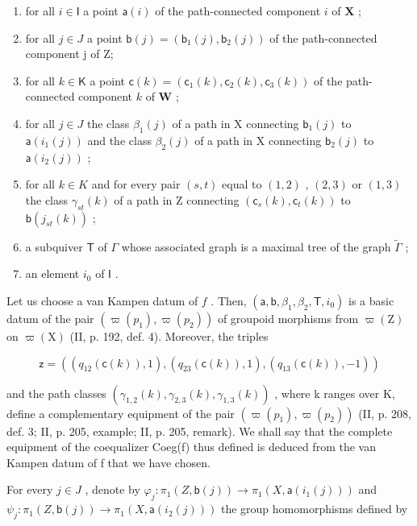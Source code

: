 \begin{enumerate}
\def\labelenumi{(\roman{enumi})}
\item
  for all \(i \in \mathsf{I}\) a point \(\mathsf{a}(i)\) of the path-connected component \(i\) of \(\mathbf{X}\) ;
\item
  for all \(j \in J\) a point \(\mathsf{b}(j) = (\mathsf{b}_{1}(j), \mathsf{b}_{2}(j))\) of the path-connected component j of Z;
\item
  for all \(k \in \mathsf{K}\) a point \(\mathsf{c}(k) = (\mathsf{c}_1(k), \mathsf{c}_2(k), \mathsf{c}_3(k))\) of the path-connected component \(k\) of \(\mathbf{W}\) ;
\item
  for all \(j \in J\) the class \(\beta_{1}(j)\) of a path in X connecting \(\mathsf{b}_{1}(j)\) to \(\mathsf{a}(i_{1}(j))\) and the class \(\beta_{2}(j)\) of a path in X connecting \(\mathsf{b}_{2}(j)\) to \(\mathsf{a}(i_{2}(j))\) ;
\item
  for all \(k \in K\) and for every pair \((s, t)\) equal to \((1, 2)\) , \((2, 3)\) or \((1, 3)\) the class \(\gamma_{st}(k)\) of a path in Z connecting \((\mathsf{c}_{s}(k), \mathsf{c}_{t}(k))\) to \(\mathsf{b}(j_{st}(k))\) ;
\item
  a subquiver \(\mathsf{T}\) of \(\Gamma\) whose associated graph is a maximal tree of the graph \(\widetilde{\Gamma}\) ;
\item
  an element \(i_{0}\) of \(\mathsf{I}\) .
\end{enumerate}

Let us choose a van Kampen datum of \(f\) . Then, \((\mathsf{a},\mathsf{b},\beta_{1},\beta_{2},\mathsf{T},i_{0})\) is a basic datum of the pair \((\varpi(p_{1}),\varpi(p_{2}))\) of groupoid morphisms from \(\varpi(\mathrm{Z})\) on \(\varpi(\mathrm{X})\) (II, p. 192, def. 4). Moreover, the triples

\[
\mathsf {z} = \left(\left(q _ {1 2} (\mathsf {c} (k)), 1\right), \left(q _ {2 3} (\mathsf {c} (k)), 1\right), \left(q _ {1 3} (\mathsf {c} (k)), - 1\right)\right)
\]

and the path classes \((\gamma_{1,2}(k), \gamma_{2,3}(k), \gamma_{1,3}(k))\) , where k ranges over K, define a complementary equipment of the pair \((\varpi(p_{1}), \varpi(p_{2}))\) (II, p. 208, def. 3; II, p. 205, example; II, p. 205, remark). We shall say that the complete equipment of the coequalizer Coeg(f) thus defined is deduced from the van Kampen datum of f that we have chosen.

For every \(j \in J\) , denote by \(\varphi_{j} \colon \pi_{1}(Z, \mathsf{b}(j)) \to \pi_{1}(X, \mathsf{a}(i_{1}(j)))\) and \(\psi_{j} \colon \pi_{1}(Z, \mathsf{b}(j)) \to \pi_{1}(X, \mathsf{a}(i_{2}(j)))\) the group homomorphisms defined by

